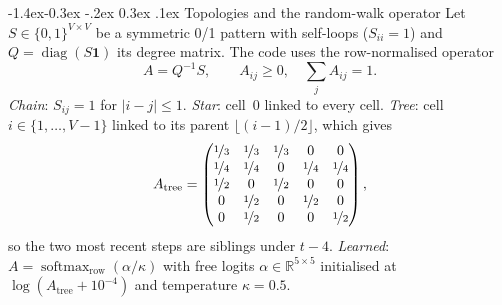 \documentclass[10pt,twocolumn,letterpaper]{article}
\makeatletter
\renewcommand\subsection{\@startsection{subsection}{2}{\z@}%
  {-1.4ex\@plus -0.3ex \@minus -.2ex}%
  {0.3ex \@plus .1ex}%
  {\normalfont\normalsize\bfseries}}
\makeatother
\begin{document}
\subsection{Topologies and the random-walk operator}\label{sec:topologies}
Let $S \in \{0,1\}^{V\times V}$ be a symmetric 0/1 pattern with self-loops ($S_{ii}=1$) and $Q = \operatorname{diag}(S\mathbf{1})$ its degree matrix. The code uses the row-normalised operator
\begin{equation}\label{eq:rownorm}
A = Q^{-1} S, \qquad A_{ij} \ge 0, \quad \textstyle\sum_j A_{ij} = 1 .
\end{equation}
\emph{Chain}: $S_{ij}=1$ for $|i-j|\le1$. \emph{Star}: cell~0 linked to every cell. \emph{Tree}: cell $i\in\{1,\dots,V{-}1\}$ linked to its parent $\lfloor (i-1)/2\rfloor$, which gives
\begin{equation}\label{eq:atree}
A_{\text{tree}} = \begin{pmatrix}
\nicefrac13 & \nicefrac13 & \nicefrac13 & 0 & 0\\
\nicefrac14 & \nicefrac14 & 0 & \nicefrac14 & \nicefrac14\\
\nicefrac12 & 0 & \nicefrac12 & 0 & 0\\
0 & \nicefrac12 & 0 & \nicefrac12 & 0\\
0 & \nicefrac12 & 0 & 0 & \nicefrac12
\end{pmatrix},
\end{equation}
so the two most recent steps are siblings under $t{-}4$. \emph{Learned}: $A = \operatorname{softmax}_{\text{row}}(\alpha/\kappa)$ with free logits $\alpha\in\mathbb{R}^{5\times5}$ initialised at $\log(A_{\text{tree}}+10^{-4})$ and temperature $\kappa{=}0.5$.
\end{document}
